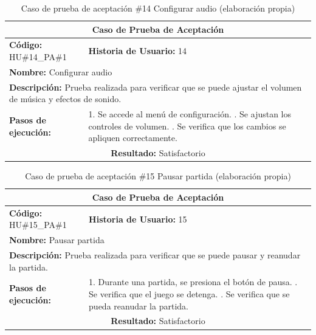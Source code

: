 \begin{table}[H]
\centering
\caption{Caso de prueba de aceptación \#14 Configurar audio (elaboración propia)\label{tab:cpa14}}
\renewcommand{\arraystretch}{1.3}
\begin{tabular}{|p{}|p{}|}
\hline
\multicolumn{2}{|c|}{\textbf{Caso de Prueba de Aceptación}} \\
\hline
\textbf{Código:} HU\#14\_PA\#1 & \textbf{Historia de Usuario:} 14 \\
\hline
\multicolumn{2}{|l|}{\textbf{Nombre:} Configurar audio} \\
\hline
\multicolumn{2}{|p{0.9\textwidth}|}{\textbf{Descripción:} Prueba realizada para verificar que se puede ajustar el volumen de música y efectos de sonido.} \\
\hline
\textbf{Pasos de ejecución:} & 1. Se accede al menú de configuración. \newline 2. Se ajustan los controles de volumen. \newline 3. Se verifica que los cambios se apliquen correctamente. \\
\hline
\multicolumn{2}{|c|}{\textbf{Resultado:} Satisfactorio} \\
\hline
\end{tabular}
\end{table}

\begin{table}[H]
\centering
\caption{Caso de prueba de aceptación \#15 Pausar partida (elaboración propia)\label{tab:cpa15}}
\renewcommand{\arraystretch}{1.3}
\begin{tabular}{|p{}|p{}|}
\hline
\multicolumn{2}{|c|}{\textbf{Caso de Prueba de Aceptación}} \\
\hline
\textbf{Código:} HU\#15\_PA\#1 & \textbf{Historia de Usuario:} 15 \\
\hline
\multicolumn{2}{|l|}{\textbf{Nombre:} Pausar partida} \\
\hline
\multicolumn{2}{|p{0.9\textwidth}|}{\textbf{Descripción:} Prueba realizada para verificar que se puede pausar y reanudar la partida.} \\
\hline
\textbf{Pasos de ejecución:} & 1. Durante una partida, se presiona el botón de pausa. \newline 2. Se verifica que el juego se detenga. \newline 3. Se verifica que se pueda reanudar la partida. \\
\hline
\multicolumn{2}{|c|}{\textbf{Resultado:} Satisfactorio} \\
\hline
\end{tabular}
\end{table}

